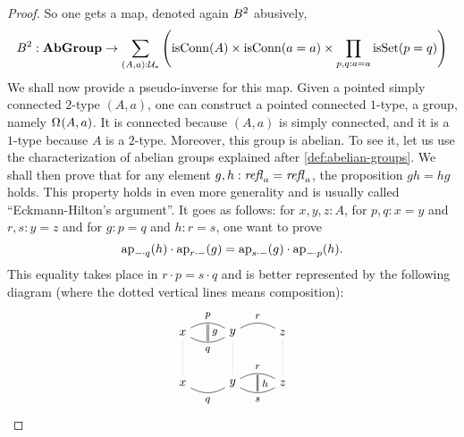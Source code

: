 \begin{proof}
  So one gets a map, denoted again $B^2$ abusively,
  \begin{displaymath}
    B^2 : \mathbf{AbGroup} \to \sum_{(A,a):\mathcal{U}_\ast}\left(
      \mathrm{isConn}(A) \times \mathrm{isConn}(a=a) \times \prod_{p,q:a=a}\mathrm{isSet}(p=q)
    \right)
  \end{displaymath}
  We shall now provide a pseudo-inverse for this map. Given a pointed
  simply connected $2$-type $(A,a)$, one can construct a pointed
  connected $1$-type, \ie a group, namely $\loopspace (A,a)$. It is
  connected because $(A,a)$ is simply connected, and it is a $1$-type
  because $A$ is a $2$-type. Moreover, this group is abelian. To see
  it, let us use the characterization of abelian groups explained
  after \cref{def:abelian-groups}. We shall then prove that for any
  element $g,h:\mathop{\mathit{refl}_{a}}=\mathop{\mathit{refl}_{a}}$, the proposition $gh=hg$ holds. This
  property holds in even more generality and is usually called
  ``Eckmann-Hilton's argument''. It goes as follows: for $x,y,z:A$,
  for $p,q:x=y$ and $r,s:y=z$ and for $g:p=q$ and $h:r=s$, one want to
  prove
  \begin{displaymath}
    \mathop{\mathrm{ap}_{{-}\cdot q}}(h) \cdot \mathop{\mathrm{ap}_{r\cdot{-}}}(g)
    = \mathop{\mathrm{ap}_{s\cdot {-}}}(g) \cdot \mathop{\mathrm{ap}_{{-}\cdot p}}(h).
  \end{displaymath}
  This equality takes place in $r\cdot p = s\cdot q$ and is better
  represented by the following diagram (where the dotted vertical
  lines means composition):
  \begin{displaymath}
    \begin{tikzpicture}[node distance=4em, baseline=(basenode.base)]
      \node[] (x1) {$x$};
      \node[right of=x1] (y1) {$y$};
      \node[right of=y1] (z1) {$z$};
      \node[below of=x1] (x2) {$x$};
      \node[right of=x2] (y2) {$y$};
      \node[right of=y2] (z2) {$z$};
      \draw[bend left] (x1) to node[above] (p) {\footnotesize$p$} (y1);
      \draw[bend right] (x1) to  node[below] (q1) {\footnotesize$q$} (y1);
      \draw[bend left] (y1) to node[above] (r1) {\footnotesize$r$} (z1);
      \draw[bend left] (y2) to node[above] (r2) {\footnotesize$r$} (z2);
      \draw[bend right] (y2) to  node[below] (s) {\footnotesize$s$} (z2);
      \draw[bend right] (x2) to node[below] (q2) {\footnotesize$q$} (y2);
      \draw[double, shorten >=.1em, shorten <=.1em] (p) to node[right] {\footnotesize$g$} (q1);
      \draw[double, shorten >=.1em, shorten <=.1em] (r2) to node[right] {\footnotesize$h$} (s);
      \draw[gray,densely dotted] (x1) to node (basenode){} (x2) (y1) to (y2) (z1) to (z2);
    \end{tikzpicture}%

\end{displaymath}
\end{proof}
